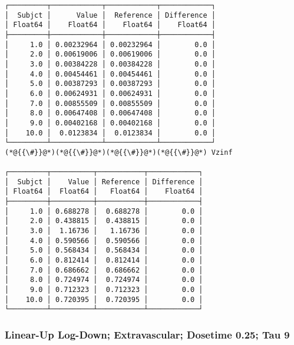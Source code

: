 \documentclass[12pt,a4paper]{article}
\begin{document}
\begin{lstlisting}
┌─────────┬────────────┬────────────┬────────────┐
│  Subjct │      Value │  Reference │ Difference │
│ Float64 │    Float64 │    Float64 │    Float64 │
├─────────┼────────────┼────────────┼────────────┤
│     1.0 │ 0.00232964 │ 0.00232964 │        0.0 │
│     2.0 │ 0.00619006 │ 0.00619006 │        0.0 │
│     3.0 │ 0.00384228 │ 0.00384228 │        0.0 │
│     4.0 │ 0.00454461 │ 0.00454461 │        0.0 │
│     5.0 │ 0.00387293 │ 0.00387293 │        0.0 │
│     6.0 │ 0.00624931 │ 0.00624931 │        0.0 │
│     7.0 │ 0.00855509 │ 0.00855509 │        0.0 │
│     8.0 │ 0.00647408 │ 0.00647408 │        0.0 │
│     9.0 │ 0.00402168 │ 0.00402168 │        0.0 │
│    10.0 │  0.0123834 │  0.0123834 │        0.0 │
└─────────┴────────────┴────────────┴────────────┘
(*@{{\#}}@*)(*@{{\#}}@*)(*@{{\#}}@*)(*@{{\#}}@*) Vzinf

┌─────────┬──────────┬───────────┬────────────┐
│  Subjct │    Value │ Reference │ Difference │
│ Float64 │  Float64 │   Float64 │    Float64 │
├─────────┼──────────┼───────────┼────────────┤
│     1.0 │ 0.688278 │  0.688278 │        0.0 │
│     2.0 │ 0.438815 │  0.438815 │        0.0 │
│     3.0 │  1.16736 │   1.16736 │        0.0 │
│     4.0 │ 0.590566 │  0.590566 │        0.0 │
│     5.0 │ 0.568434 │  0.568434 │        0.0 │
│     6.0 │ 0.812414 │  0.812414 │        0.0 │
│     7.0 │ 0.686662 │  0.686662 │        0.0 │
│     8.0 │ 0.724974 │  0.724974 │        0.0 │
│     9.0 │ 0.712323 │  0.712323 │        0.0 │
│    10.0 │ 0.720395 │  0.720395 │        0.0 │
└─────────┴──────────┴───────────┴────────────┘
\end{lstlisting}


\subsubsection{Linear-Up Log-Down; Extravascular; Dosetime 0.25; Tau 9}
\end{document}
